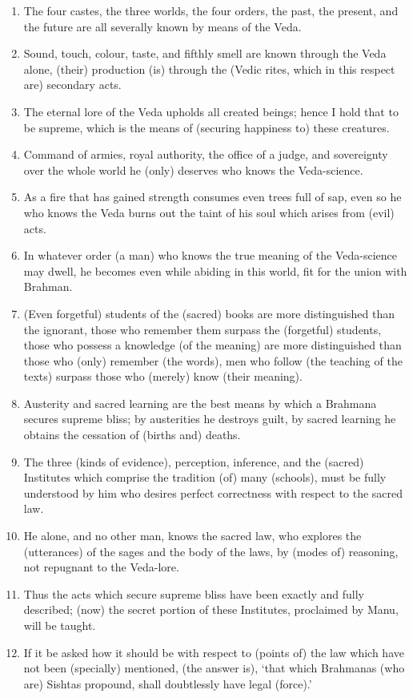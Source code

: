\begin{enumerate}
\item The four castes, the three worlds, the four orders, the past, the present, and the future are all severally known by means of the Veda.
\item Sound, touch, colour, taste, and fifthly smell are known through the Veda alone, (their) production (is) through the (Vedic rites, which in this respect are) secondary acts.
\item The eternal lore of the Veda upholds all created beings; hence I hold that to be supreme, which is the means of (securing happiness to) these creatures.
\item Command of armies, royal authority, the office of a judge, and sovereignty over the whole world he (only) deserves who knows the Veda-science.
\item As a fire that has gained strength consumes even trees full of sap, even so he who knows the Veda burns out the taint of his soul which arises from (evil) acts.
\item In whatever order (a man) who knows the true meaning of the Veda-science may dwell, he becomes even while abiding in this world, fit for the union with Brahman.
\item (Even forgetful) students of the (sacred) books are more distinguished than the ignorant, those who remember them surpass the (forgetful) students, those who possess a knowledge (of the meaning) are more distinguished than those who (only) remember (the words), men who follow (the teaching of the texts) surpass those who (merely) know (their meaning).
\item Austerity and sacred learning are the best means by which a Brahmana secures supreme bliss; by austerities he destroys guilt, by sacred learning he obtains the cessation of (births and) deaths.
\item The three (kinds of evidence), perception, inference, and the (sacred) Institutes which comprise the tradition (of) many (schools), must be fully understood by him who desires perfect correctness with respect to the sacred law.
\item He alone, and no other man, knows the sacred law, who explores the (utterances) of the sages and the body of the laws, by (modes of) reasoning, not repugnant to the Veda-lore.
\item Thus the acts which secure supreme bliss have been exactly and fully described; (now) the secret portion of these Institutes, proclaimed by Manu, will be taught.
\item If it be asked how it should be with respect to (points of) the law which have not been (specially) mentioned, (the answer is), `that which Brahmanas (who are) Sishtas propound, shall doubtlessly have legal (force).'

\end{enumerate}
